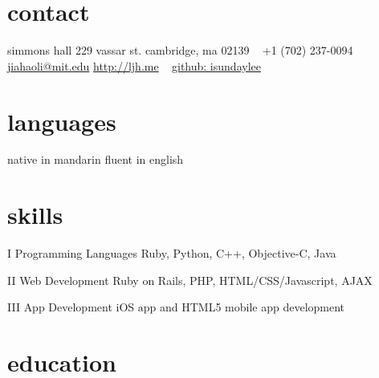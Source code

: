 \documentclass[]{friggeri-cv} %
\begin{document}


\begin{aside} %
\section{contact}
simmons hall
229 vassar st.
cambridge, ma 02139
~
+1 (702) 237-0094
~
\href{mailto:jiahaoli@mit.edu}{jiahaoli@mit.edu}
\href{http://ljh.me}{http://ljh.me}
~
\href{http://github.com/isundaylee}{github: isundaylee}
\section{languages}
native in mandarin
fluent in english
\end{aside}


\section{skills}

\begin{entrylist}
  \entry
  {I}
  {Programming Languages}
  {}
  {Ruby, Python, C++, Objective-C, Java}

  \entry
  {II}
  {Web Development}
  {}
  {Ruby on Rails, PHP, HTML/CSS/Javascript, AJAX}

  \entry
  {III}
  {App Development}
  {}
  {iOS app and HTML5 mobile app development}
\end{entrylist}


\section{education}
\end{document}
